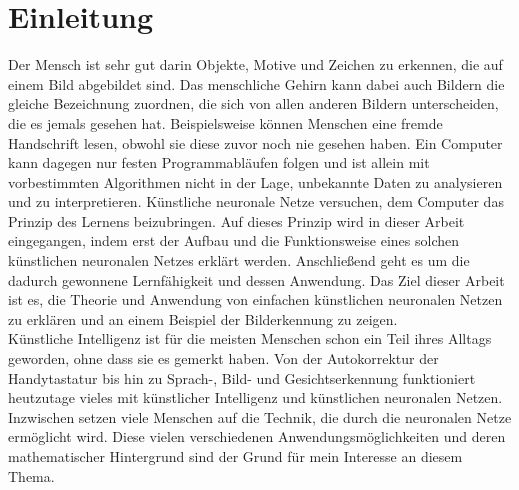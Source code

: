 \section{Einleitung}\label{sec:einleitung}
Der Mensch ist sehr gut darin Objekte, Motive und Zeichen zu erkennen, die auf einem Bild abgebildet sind.
Das menschliche Gehirn kann dabei auch Bildern die gleiche Bezeichnung zuordnen, die sich von allen anderen Bildern unterscheiden, die es jemals gesehen hat.
Beispielsweise können Menschen eine fremde Handschrift lesen, obwohl sie diese zuvor noch nie gesehen haben.
Ein Computer kann dagegen nur festen Programmabläufen folgen und ist allein mit vorbestimmten Algorithmen nicht in der Lage, unbekannte Daten zu analysieren und zu interpretieren.
Künstliche neuronale Netze versuchen, dem Computer das Prinzip des Lernens beizubringen.
Auf dieses Prinzip wird in dieser Arbeit eingegangen, indem erst der Aufbau und die Funktionsweise eines solchen künstlichen neuronalen Netzes erklärt werden.
Anschließend geht es um die dadurch gewonnene Lernfähigkeit und dessen Anwendung.
Das Ziel dieser Arbeit ist es, die Theorie und Anwendung von einfachen künstlichen neuronalen Netzen zu erklären und an einem Beispiel der Bilderkennung zu zeigen.\\
Künstliche Intelligenz ist für die meisten Menschen schon ein Teil ihres Alltags geworden, ohne dass sie es gemerkt haben.
Von der Autokorrektur der Handytastatur bis hin zu Sprach-, Bild- und Gesichtserkennung funktioniert heutzutage vieles mit künstlicher Intelligenz und künstlichen neuronalen Netzen.
Inzwischen setzen viele Menschen auf die Technik, die durch die neuronalen Netze ermöglicht wird.
Diese vielen verschiedenen Anwendungsmöglichkeiten und deren mathematischer Hintergrund sind der Grund für mein Interesse an diesem Thema.